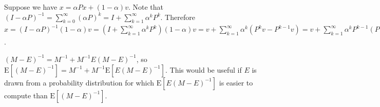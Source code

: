 \documentclass{article}
\newcommand \E[1] {\mathrm E \left[#1\right]} %
\newcommand \inv [1] {{#1}^{-1}} %
\begin{document}
Suppose we have $x=\alpha Px + (1-\alpha)v$. Note that $\inv{(I-\alpha
  P)} = \sum_{k=0}^\infty (\alpha P)^k = I+\sum_{k=1}^\infty \alpha^k
P^k$. Therefore $x=\inv{(I-\alpha P)}(1-\alpha)v =
(I+\sum_{k=1}^\infty \alpha^k P^k)(1-\alpha)v = v+\sum_{k=1}^\infty
\alpha^k (P^k v -P^{k-1}v) = v+\sum_{k=1}^\infty \alpha^k P^{k-1}
(P-I)v = \left( I+\sum_{k=1}^\infty (\alpha^k P^{k-1}) (P-I)\right)v =
(I+\alpha(I-\alpha P)^{-1})(P-I)v$.

$(M-E)^{-1} = \inv M + \inv M E (M-E)^{-1}$, so $\E{(M-E)^{-1}} = \inv
M + \inv M \E{E(M-E)^{-1}}$. This would be useful if $E$ is drawn from
a probability distribution for which $\E{E(M-E)^{-1}}$ is easier to
compute than $\E{(M-E)^{-1}}$.

\nocite{Constantine:2009:Random}


 
\end{document}
